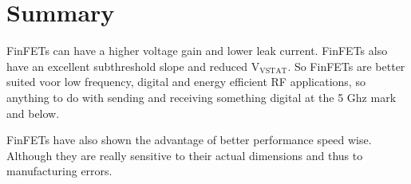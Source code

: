 \documentclass{article}
\begin{document}
\chapter{Summary}
FinFETs can have a higher voltage gain and lower leak current. FinFETs also have an excellent subthreshold slope and reduced $\mathrm{V}_{\mathrm{VSTAT}}$. So FinFETs are better suited voor low frequency, digital and energy efficient RF applications, so anything to do with sending and receiving something digital at the 5 Ghz mark and below.\cite{1609503}

FinFETs have also shown the advantage of better performance speed wise. Although they are really sensitive to their actual dimensions and thus to manufacturing errors.\cite{Liao20139}


\printbibliography
\end{document}
